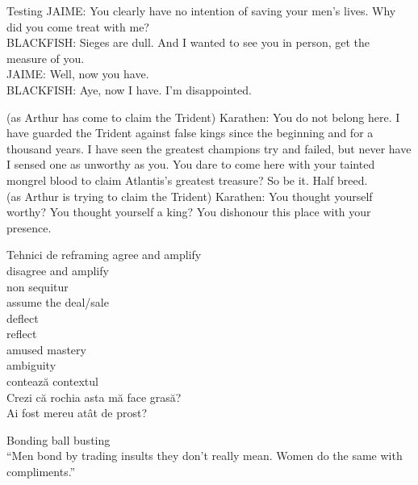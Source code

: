 \documentclass{simple}
\begin{document}
\begin{frame}{Testing}
  \pause
  JAIME: You clearly have no intention of saving your men’s lives. Why did you come treat with me? \\
  \pause
  BLACKFISH: Sieges are dull. And I wanted to see you in person, get the measure of you. \\
  \pause
  JAIME: Well, now you have. \\
  \pause
  BLACKFISH: Aye, now I have. I’m disappointed. \\

  \vspace{1cm}

  \pause
  (as Arthur has come to claim the Trident) Karathen: You do not belong here. I have guarded the Trident against false kings since the beginning and for a thousand years. I have seen the greatest champions try and failed, but never have I sensed one as unworthy as you. You dare to come here with your tainted mongrel blood to claim Atlantis’s greatest treasure? So be it. Half breed. \\
  \pause
  (as Arthur is trying to claim the Trident) Karathen: You thought yourself worthy? You thought yourself a king? You dishonour this place with your presence.
\end{frame}

\begin{frame}{Tehnici de reframing}
  \pause agree and amplify \\
  \pause disagree and amplify \\
  \pause non sequitur \\
  \pause assume the deal/sale \\
  \pause deflect \\
  \pause reflect \\
  \pause amused mastery \\
  \pause ambiguity \\
  \vspace{1cm}
  \pause
  contează contextul \\
  \vspace{1cm}
  \pause
  Crezi că rochia asta mă face grasă? \\
  \pause
  Ai fost mereu atât de prost? \\
\end{frame}

\begin{frame}{Bonding}
  \pause
  ball busting \\
  \pause
  ``Men bond by trading insults they don't really mean. Women do the same with compliments.''
\end{frame}
\end{document}
